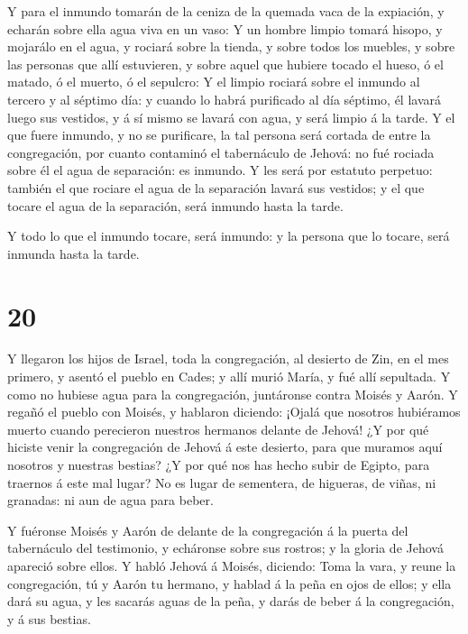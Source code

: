  Y para el inmundo tomarán de la ceniza de la quemada vaca
de la expiación, y echarán sobre ella agua viva en un vaso:
 Y un hombre limpio tomará hisopo, y mojarálo en el agua, y
rociará sobre la tienda, y sobre todos los muebles, y sobre las personas
que allí estuvieren, y sobre aquel que hubiere tocado el hueso, ó el
matado, ó el muerto, ó el sepulcro:  Y el limpio rociará
sobre el inmundo al tercero y al séptimo día: y cuando lo habrá
purificado al día séptimo, él lavará luego sus vestidos, y á sí mismo se
lavará con agua, y será limpio á la tarde.  Y el que fuere
inmundo, y no se purificare, la tal persona será cortada de entre la
congregación, por cuanto contaminó el tabernáculo de Jehová: no fué
rociada sobre él el agua de separación: es inmundo.  Y les
será por estatuto perpetuo: también el que rociare el agua de la
separación lavará sus vestidos; y el que tocare el agua de la
separación, será inmundo hasta la tarde.

 Y todo lo que el inmundo tocare, será inmundo: y la
persona que lo tocare, será inmunda hasta la tarde.

\hypertarget{section-19}{%
\section{20}\label{section-19}}

 Y llegaron los hijos de Israel, toda la congregación, al
desierto de Zin, en el mes primero, y asentó el pueblo en Cades; y allí
murió María, y fué allí sepultada.  Y como no hubiese agua
para la congregación, juntáronse contra Moisés y Aarón.  Y
regañó el pueblo con Moisés, y hablaron diciendo: ¡Ojalá que nosotros
hubiéramos muerto cuando perecieron nuestros hermanos delante de Jehová!
 ¿Y por qué hiciste venir la congregación de Jehová á este
desierto, para que muramos aquí nosotros y nuestras bestias?
 ¿Y por qué nos has hecho subir de Egipto, para traernos á
este mal lugar? No es lugar de sementera, de higueras, de viñas, ni
granadas: ni aun de agua para beber.

 Y fuéronse Moisés y Aarón de delante de la congregación á
la puerta del tabernáculo del testimonio, y echáronse sobre sus rostros;
y la gloria de Jehová apareció sobre ellos.  Y habló Jehová
á Moisés, diciendo:  Toma la vara, y reune la congregación,
tú y Aarón tu hermano, y hablad á la peña en ojos de ellos; y ella dará
su agua, y les sacarás aguas de la peña, y darás de beber á la
congregación, y á sus bestias.

